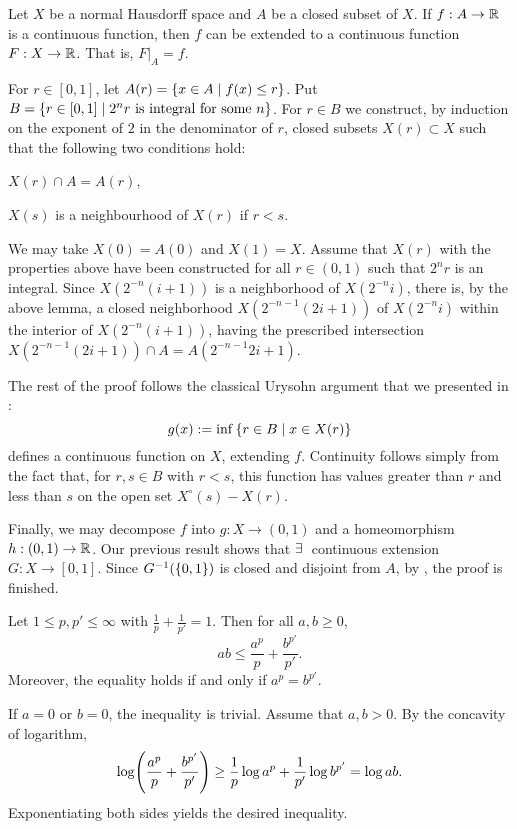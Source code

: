 \begin{theorem}
    Let $X$ be a normal Hausdorff space and $A$ be a 
    closed subset of $X$. If $f:A\to\mathbb{R}$ is a continuous 
    function, then $f$ can be extended to a continuous 
    function $F:X\to\mathbb{R}$. That is, $F|_A = f$. 
\end{theorem}
\begin{pf}
    For $r\in[0,1]$, let $A(r) = \left\{ {x\in A\mid f(x)\leq r} \right\}$. 
    Put $B = \left\{ r\in[0, 1] \;\middle\vert\; 2^nr\text{ is integral for some }n \right\}$.
    For $r \in B$ we construct, by induction on the exponent of 
    $2$ in the denominator of $r$, closed subsets $X(r)\subset X$ 
    such that the following two conditions hold:
    \begin{thmenum}
        \item $X(r) \cap A = A(r)$,
        \item $X(s)$ is a neighbourhood of $X(r)$ if $r < s$.
    \end{thmenum}
    We may take $X(0)=A(0) $ and $X(1)=X$. Assume that $X(r)$ 
    with the properties above have been constructed for all 
    $r\in(0,1)$ such that $2^nr$ is an integral. Since 
    $X(2^{-n}(i+1))$ is a neighborhood of $ X(2^{-n}i)$, 
    there is, by the above lemma, a closed neighborhood 
    $X(2^{-n-1}(2i+1))$ of $ X(2^{-n}i) $ within the interior 
    of $X(2^{-n}(i+1))$, having the prescribed intersection 
    $X(2^{-n-1}(2i+1)) \cap A = A(2^{-n-1}2i + 1)$.

    The rest of the proof follows the classical Urysohn argument
    that we presented in :
    \[
        g(x) := \inf \left\{ r\in B \;\middle\vert\; x\in X(r) \right\}
    \]
    defines a continuous function on $X$, extending $f$. 
    Continuity follows simply from the fact that, for 
    $r,s\in B$ with $r<s$, this function has values greater 
    than $r$ and less than $s$ on the open set 
    $X^\circ(s)-X(r)$. 

    Finally, we may decompose $f$ into $g: X\to (0,1)$ and a 
    homeomorphism $h: (0,1)\to\mathbb{R}$. Our previous result shows 
    that $\exists\:$ continuous extension $G:X\to[0,1]$. Since 
    $G^{-1}(\left\{ {0,1} \right\})$ is closed and disjoint from $A$, by 
    , the proof is finished.
\end{pf}

\begin{lemma}
    Let $1\leq p,p'\leq\infty$ with $\frac{1}{p}+\frac{1}{p'}=1$. 
    Then for all $a,b\geq 0$, 
    \begin{equation*}
        ab \leq \frac{a^p}{p} + \frac{b^{p'}}{p'}.
    \end{equation*}
    Moreover, the equality holds if and only if $a^p = b^{p'}$.
\end{lemma}
\begin{pf}
    If $a = 0$ or $b = 0$, the inequality is trivial. 
    Assume that $a,b>0$. By the concavity of logarithm, 
    \begin{equation*}
        \log\pth{\frac{a^p}{p} + \frac{b^{p'}}{p'}} \geq \frac{1}{p}\log a^p + \frac{1}{p'}\log b^{p'} = \log ab.
    \end{equation*}
    Exponentiating both sides yields the desired inequality.
\end{pf}

